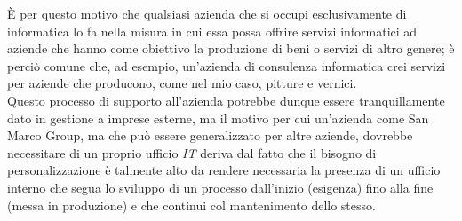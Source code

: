È per questo motivo che qualsiasi azienda che si occupi esclusivamente di informatica lo fa nella misura in cui essa possa offrire servizi informatici ad aziende che hanno come obiettivo la produzione di beni o servizi di altro genere; è perciò comune che, ad esempio, un'azienda di consulenza informatica crei servizi per aziende che producono, come nel mio caso, pitture e vernici.\\
Questo processo di supporto all'azienda potrebbe dunque essere tranquillamente dato in gestione a imprese esterne, ma il motivo per cui un'azienda come San Marco Group, ma che può essere generalizzato per altre aziende, dovrebbe necessitare di un proprio ufficio \textit{IT} deriva dal fatto che il bisogno di personalizzazione è talmente alto da rendere necessaria la presenza di un ufficio interno che segua lo sviluppo di un processo dall'inizio (esigenza) fino alla fine (messa in produzione) e che continui col mantenimento dello stesso.\\

























